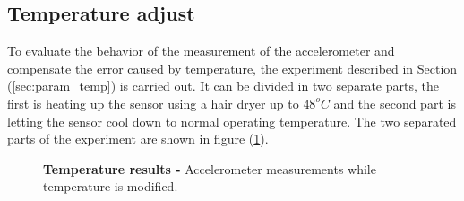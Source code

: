 \documentclass[conference]{IEEEtran}
\newcommand{\refp}[1]{(\ref{#1})}
\begin{document}
\subsection{Temperature adjust}

To evaluate the behavior of the measurement of the accelerometer and compensate the error caused by temperature, the experiment described in Section \refp{sec:param_temp} is carried out. It can be divided in two separate parts, the first is heating up the sensor using a hair dryer up to $48^oC$ and the second part is letting the sensor cool down to normal operating temperature. The two separated parts of the experiment are shown in figure \refp{fig:temp_res}.

\begin{figure}[h!]
	\caption{\textbf{Temperature results -} Accelerometer measurements while temperature is modified.}
	\label{fig:temp_res}
\end{figure}
\end{document}
